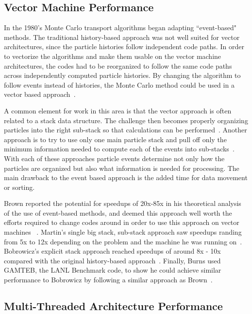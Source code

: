\subsection*{Vector Machine Performance}

%
In the 1980's Monte Carlo transport algorithms began adapting ``event-based" methods.
%
The traditional history-based approach was not well suited for vector architectures, since the particle histories follow independent code paths.
%
In order to vectorize the algorithms and make them usable on the vector machine architectures, the codes had to be reorganized to follow the same code paths across independently computed particle histories.
%
By changing the algorithm to follow events instead of histories, the Monte Carlo method could be used in a vector based approach~\cite{martin1986monte}.
%

%
A common element for work in this area is that the vector approach is often related to a stack data structure.
%
The challenge then becomes properly organizing particles into the right sub-stack so that calculations can be performed~\cite{brown1984monte, bobrowicz1984vectorized}.
%
Another approach is to try to use only one main particle stack and pull off only the minimum information needed to compute each of the events into sub-stacks~\cite{martin1986monte}.
%
With each of these approaches particle events determine not only how the particles are organized but also what information is needed for processing. 
%
The main drawback to the event based approach is the added time for data movement or sorting.
%

%
Brown reported the potential for speedups of 20x-85x in his theoretical analysis of the use of event-based methods, and deemed this approach well worth the efforts required to change codes around in order to use this approach on vector machines ~\cite{brown1984monte}.
%
Martin's single big stack, sub-stack approach saw speedups randing from 5x to 12x depending on the problem and the machine he was running on~\cite{martin1986monte}.
%
Bobrowicz's explicit stack approach reached speedups of around 8x - 10x compared with the original history-based approach~\cite{bobrowicz1984vectorized}.
%
Finally, Burns used GAMTEB, the LANL Benchmark code, to show he could achieve similar performance to Bobrowicz by following a similar approach as Brown~\cite{burns1989vectorization}.
%

\subsection*{Multi-Threaded Architecture Performance}

